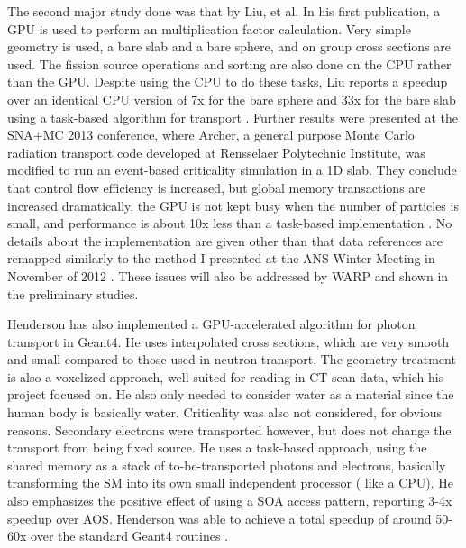 The second major study done was that by Liu, et al.  In his first publication, a GPU is used to perform an multiplication factor calculation.  Very simple geometry is used, a bare slab and a bare sphere, and on group cross sections are used.  The fission source operations and sorting are also done on the CPU rather than the GPU.  Despite using the CPU to do these tasks, Liu reports a speedup over an identical CPU version of 7x for the bare sphere and 33x for the bare slab using a task-based algorithm for transport \cite{tianyu}.  Further results were presented at the SNA+MC 2013 conference, where Archer, a general purpose Monte Carlo radiation transport code developed at Rensselaer Polytechnic Institute, was modified to run an event-based criticality simulation in a 1D slab.  They conclude that control flow efficiency is increased, but global memory transactions are increased dramatically, the GPU is not kept busy when the number of particles is small, and performance is about 10x less than a task-based implementation \cite{tianyu_snamc}.  No details about the implementation are given other than that data references are remapped similarly to the method I presented at the ANS Winter Meeting in November of 2012 \cite{bergmann_ans_winter}.  These issues will also be addressed by WARP and shown in the preliminary studies.

Henderson has also implemented a GPU-accelerated algorithm for photon transport in Geant4.   He uses interpolated cross sections, which are very smooth and small compared to those used in neutron transport.  The geometry treatment is also a voxelized approach, well-suited for reading in CT scan data, which his project focused on.  He also only needed to consider water as a material since the human body is basically water.  Criticality was also not considered, for obvious reasons. Secondary electrons were transported however, but does not change the transport from being fixed source. He uses a task-based approach, using the shared memory as a stack of to-be-transported photons and electrons, basically transforming the SM into its own small independent processor ( like a CPU).  He also emphasizes the positive effect of using a SOA access pattern, reporting 3-4x speedup over AOS.  Henderson was able to achieve a total speedup of around 50-60x over the standard Geant4 routines \cite{henderson}.


